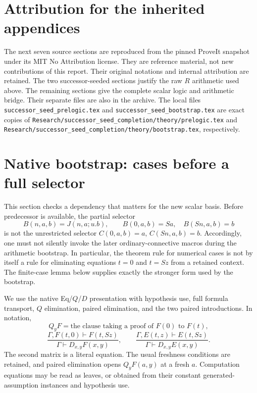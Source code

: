 \documentclass[11pt]{article}
\theoremstyle{definition}
\newcommand{\file}[1]{{\small\nolinkurl{#1}}}
\begin{document}
\section*{Attribution for the inherited appendices}
The next seven source sections are reproduced from the pinned ProveIt
snapshot under its MIT No Attribution license. They are reference material,
not new contributions of this report. Their original notations and internal
attribution are retained. The two successor-seeded sections justify the raw
$R$ arithmetic used above. The remaining sections give the complete scalar
logic and arithmetic bridge. Their separate files are also in the archive.
The local files \file{successor_seed_prelogic.tex} and
\file{successor_seed_bootstrap.tex} are exact copies of
\file{Research/successor_seed_completion/theory/prelogic.tex} and
\file{Research/successor_seed_completion/theory/bootstrap.tex}, respectively.



\section{Native bootstrap: cases before a full selector}
\label{nb:section}

This section checks a dependency that matters for the new scalar basis.
Before predecessor is available, the partial selector
\[
 B(n,a,b)=J(n,a;u.b),\qquad B(0,a,b)=Sa,\quad B(Sn,a,b)=b
\]
is not the unrestricted selector $C(0,a,b)=a$, $C(Sn,a,b)=b$.
Accordingly, one must not silently invoke the later ordinary-connective
macros during the arithmetic bootstrap.  In particular, the theorem rule
for numerical cases is not by itself a rule for eliminating equations
$t=0$ and $t=Sz$ from a retained context.  The finite-case lemma below
supplies exactly the stronger form used by the bootstrap.

We use the native Eq/$Q$/$D$ presentation with hypothesis use, full
formula transport, $Q$ elimination, paired elimination, and the two
paired introductions.  In notation,
\[
 Q_yF=\text{the clause taking a proof of }F(0)\text{ to }F(t),
\]
\[
 \frac{\Gamma,F(t,0)\vdash F(t,Sz)}
      {\Gamma\vdash D_{x,y}F(x,y)},\qquad
 \frac{\Gamma,E(t,z)\vdash E(t,Sz)}
      {\Gamma\vdash D_{x,y}E(x,y)}.
\]
The second matrix is a literal equation.  The usual freshness conditions
are retained, and paired elimination opens $Q_yF(a,y)$ at a fresh $a$.
Computation equations may be read as leaves, or obtained from their
constant generated-assumption instances and hypothesis use.
\end{document}
